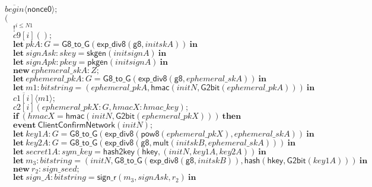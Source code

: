 \documentclass{article}
\newcommand{\cinput}[2]{{#1}({#2})}
\newcommand{\coutput}[2]{\overline{#1}\langle{#2}\rangle}
\newcommand{\kw}[1]{\mathbf{#1}}
\newcommand{\kwf}[1]{\mathsf{#1}}
\newcommand{\var}[1]{\mathit{#1}}
\newcommand{\kwt}[1]{\mathit{#1}}
\newcommand{\kwp}[1]{\mathit{#1}}
\newcommand{\kwc}[1]{\mathit{#1}}
\begin{document}
\begin{tabbing}
\>$\coutput{\kwc{begin}}{\kwf{nonce0}};$\\
\>$($\\
\>$\quad !^{\var{i} \leq \kwp{N1}}$\\
\>$\quad \cinput{\kwc{c9}[\var{i}]}{};$\\
\>$\quad \kw{let}\ \var{pkA}: \kwt{G} = \kwf{G8{\_}to{\_}G}(\kwf{exp{\_}div8}(\kwf{g8}, \var{initskA}))\ \kw{in}$\\
\>$\quad \kw{let}\ \var{signAsk}: \kwt{skey} = \kwf{skgen}(\var{initsignA})\ \kw{in}$\\
\>$\quad \kw{let}\ \var{signApk}: \kwt{pkey} = \kwf{pkgen}(\var{initsignA})\ \kw{in}$\\
\>$\quad \kw{new}\ \var{ephemeral{\_}skA}: \kwt{Z};$\\
\>$\quad \kw{let}\ \var{ephemeral{\_}pkA}: \kwt{G} = \kwf{G8{\_}to{\_}G}(\kwf{exp{\_}div8}(\kwf{g8}, \var{ephemeral{\_}skA}))\ \kw{in}$\\
\>$\quad \kw{let}\ \var{m1}: \kwt{bitstring} = \kwf{}(\var{ephemeral{\_}pkA}, \kwf{hmac}(\var{initN}, \kwf{G2bit}(\var{ephemeral{\_}pkA})))\ \kw{in}$\\
\>$\quad \coutput{\kwc{c1}[\var{i}]}{\var{m1}};$\\
\>$\quad \cinput{\kwc{c2}[\var{i}]}{\var{ephemeral{\_}pkX}: \kwt{G}, \var{hmacX}: \kwt{hmac{\_}key}};$\\
\>$\quad \kw{if}\ (\var{hmacX}  =  \kwf{hmac}(\var{initN}, \kwf{G2bit}(\var{ephemeral{\_}pkX})))\ \kw{then}$\\
\>$\quad \kw{event}\ \kwf{ClientConfirmNetwork}(\var{initN});$\\
\>$\quad \kw{let}\ \var{key1A}: \kwt{G} = \kwf{G8{\_}to{\_}G}(\kwf{exp{\_}div8}(\kwf{pow8}(\var{ephemeral{\_}pkX}), \var{ephemeral{\_}skA}))\ \kw{in}$\\
\>$\quad \kw{let}\ \var{key2A}: \kwt{G} = \kwf{G8{\_}to{\_}G}(\kwf{exp{\_}div8}(\kwf{g8}, \kwf{mult}(\var{initskB}, \var{ephemeral{\_}skA})))\ \kw{in}$\\
\>$\quad \kw{let}\ \var{secret1A}: \kwt{sym{\_}key} = \kwf{hash2key}(\kwf{hkey}, \kwf{}(\var{initN}, \var{key1A}, \var{key2A}))\ \kw{in}$\\
\>$\quad \kw{let}\ \var{m}_{3}: \kwt{bitstring} = \kwf{}(\var{initN}, \kwf{G8{\_}to{\_}G}(\kwf{exp{\_}div8}(\kwf{g8}, \var{initskB})), \kwf{hash}(\kwf{hkey}, \kwf{G2bit}(\var{key1A})))\ \kw{in}$\\
\>$\quad \kw{new}\ \var{r}_{2}: \kwt{sign{\_}seed};$\\
\>$\quad \kw{let}\ \var{sign{\_}A}: \kwt{bitstring} = \kwf{sign{\_}r}(\var{m}_{3}, \var{signAsk}, \var{r}_{2})\ \kw{in}$\\

\end{tabbing}
\end{document}
